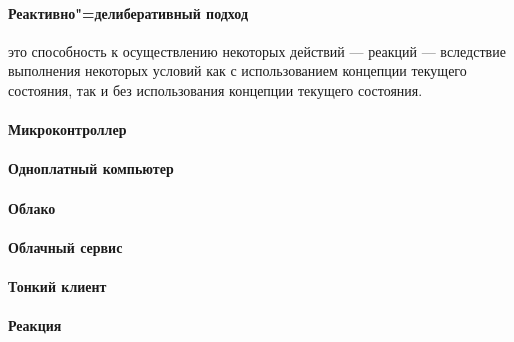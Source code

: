 \paragraph*{Реактивно"=делиберативный подход} это способность к осуществлению некоторых действий --- реакций --- вследствие выполнения некоторых условий как с использованием концепции текущего состояния, так и без использования концепции текущего состояния.

\paragraph*{Микроконтроллер}

\paragraph*{Одноплатный компьютер}

\paragraph*{Облако}

\paragraph*{Облачный сервис}

\paragraph*{Тонкий клиент}

\paragraph*{Реакция}
